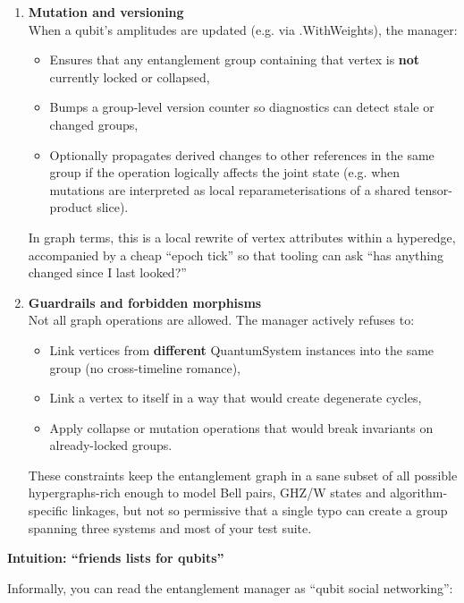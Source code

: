\documentclass[a4paper,11pt]{article}
\begin{document}
\begin{enumerate}
\item
  \textbf{Mutation and versioning}\\
  When a qubit's amplitudes are updated (e.g. via .WithWeights), the manager:

  \begin{itemize}
  \item Ensures that any entanglement group containing that vertex is \textbf{not} currently locked or collapsed,
  \item Bumps a group-level version counter so diagnostics can detect stale or changed groups,
  \item Optionally propagates derived changes to other references in the same group if the operation logically affects the joint state (e.g. when mutations are interpreted as local reparameterisations of a shared tensor-product slice).
  \end{itemize}

  In graph terms, this is a local rewrite of vertex attributes within a hyperedge, accompanied by a cheap ``epoch tick'' so that tooling can ask ``has anything changed since I last looked?''

\item
  \textbf{Guardrails and forbidden morphisms}\\
  Not all graph operations are allowed. The manager actively refuses to:

  \begin{itemize}
  \item Link vertices from \textbf{different} QuantumSystem instances into the same group (no cross-timeline romance),
  \item Link a vertex to itself in a way that would create degenerate cycles,
  \item Apply collapse or mutation operations that would break invariants on already-locked groups.
  \end{itemize}

  These constraints keep the entanglement graph in a sane subset of all possible hypergraphs-rich enough to model Bell pairs, GHZ/W states and algorithm-specific linkages, but not so permissive that a single typo can create a group spanning three systems and most of your test suite.
\end{enumerate}

\textbf{Intuition: ``friends lists for qubits''}

Informally, you can read the entanglement manager as ``qubit social networking'':
\end{document}
